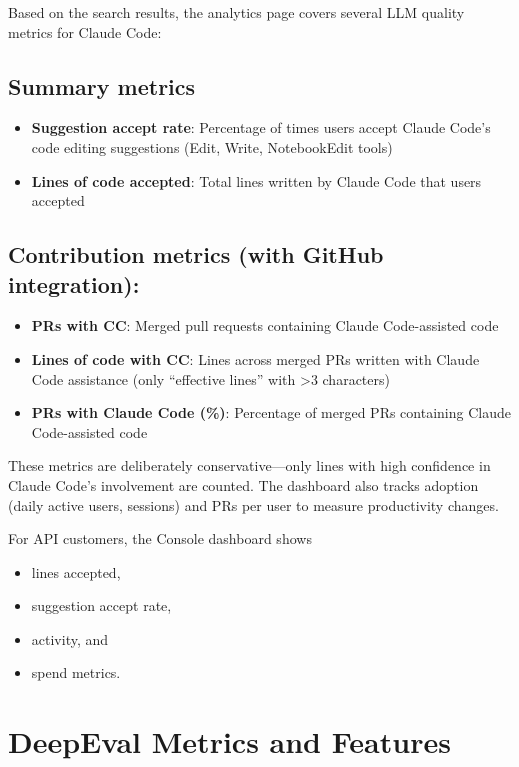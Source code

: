 \documentclass[
  letterpaper,
  DIV=11,
  numbers=noendperiod,
  oneside]{scrreprt}
\begin{document}
\begin{tcolorbox}
Based on the search results, the analytics page covers several LLM
quality metrics for Claude Code:

\section{Summary metrics}\label{summary-metrics}

\begin{itemize}
\item
  \textbf{Suggestion accept rate}: Percentage of times users accept
  Claude Code's code editing suggestions (Edit, Write, NotebookEdit
  tools)
\item
  \textbf{Lines of code accepted}: Total lines written by Claude Code
  that users accepted
\end{itemize}

\section{Contribution metrics (with GitHub
integration):}\label{contribution-metrics-with-github-integration}

\begin{itemize}
\item
  \textbf{PRs with CC}: Merged pull requests containing Claude
  Code-assisted code
\item
  \textbf{Lines of code with CC}: Lines across merged PRs written with
  Claude Code assistance (only ``effective lines'' with \textgreater3
  characters)
\item
  \textbf{PRs with Claude Code (\%)}: Percentage of merged PRs
  containing Claude Code-assisted code
\end{itemize}

These metrics are deliberately conservative---only lines with high
confidence in Claude Code's involvement are counted. The dashboard also
tracks adoption (daily active users, sessions) and PRs per user to
measure productivity changes.

For API customers, the Console dashboard shows

\begin{itemize}
\item
  lines accepted,
\item
  suggestion accept rate,
\item
  activity, and
\item
  spend metrics.
\end{itemize}

\chapter{DeepEval Metrics and
Features}\label{deepeval-metrics-and-features}


\end{tcolorbox}
\end{document}
